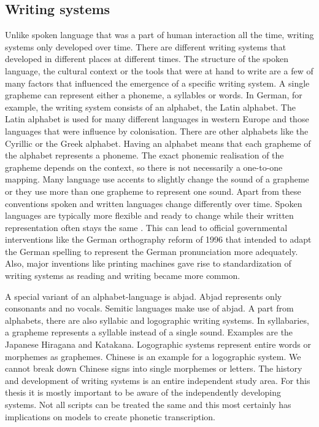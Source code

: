 
\subsection*{Writing systems}
\label{writing-sys}
Unlike spoken language that was a part of human interaction all the time, writing systems only developed over time. There are different writing systems that developed in different places at different times. The structure of the spoken language, the cultural context or the tools that were at hand to write are a few of many factors that influenced the emergence of a specific writing system. A single grapheme can represent either a phoneme, a syllables or words. In German, for example, the writing system consists of an alphabet, the Latin alphabet.  The Latin alphabet is used for many different languages in western Europe and those languages that were influence by colonisation. There are other alphabets like the Cyrillic or the Greek alphabet. Having an alphabet means that each grapheme of the alphabet represents a phoneme. The exact phonemic realisation of the grapheme depends on the context, so there is not necessarily a one-to-one mapping. Many language use accents to slightly change the sound of a grapheme or they use more than one grapheme to represent one sound. Apart from these conventions spoken and written languages change differently over time. Spoken languages are typically more flexible and ready to change while their written representation often stays the same \citep{unicode-lingu}. This can lead to official governmental interventions like the German orthography reform of 1996 that intended to adapt the German spelling to represent the German pronunciation more adequately. Also, major inventions like printing machines gave rise to standardization of writing systems as reading and writing became more common.

A special variant of an alphabet-language is abjad. Abjad represents only consonants and no vocals. Semitic languages make use of abjad. A part from alphabets, there are also syllabic and logographic writing systems. In syllabaries, a grapheme represents a syllable instead of a single sound. Examples are the Japanese Hiragana and Katakana. Logographic systems represent entire words or morphemes as graphemes. Chinese is an example for a logographic system. We cannot break down Chinese signs into single morphemes or letters. The history and development of writing systems is an entire independent study area. For this thesis it is mostly important to be aware of the independently developing systems. Not all scripts can be treated the same and this most certainly has implications on models to create phonetic transcription. 

